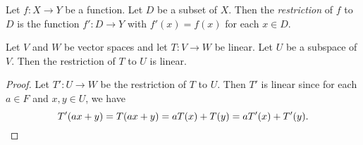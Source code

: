 \begin{definition}
  \label{def:restriction}
  Let $f: X \to Y$ be a function.
  Let $D$ be a subset of $X$.
  Then the \emph{restriction} of $f$ to $D$ is the function $f': D \to Y$
  with $f'(x) = f(x)$ for each $x \in D$.
\end{definition}

\begin{proposition}
  \label{thm:restriction-linear}
  Let $V$ and $W$ be vector spaces and let $T: V \to W$ be linear.
  Let $U$ be a subspace of $V$.
  Then the restriction of $T$ to $U$ is linear.
\end{proposition}
\begin{proof}
  Let $T': U \to W$ be the restriction of $T$ to $U$.
  Then $T'$ is linear since for each $a \in F$ and $x, y \in U$, we have
  \begin{equation*}
    T'(ax + y)
    = T(ax + y)
    = aT(x) + T(y)
    = aT'(x) + T'(y).
    \qedhere
  \end{equation*}
\end{proof}

